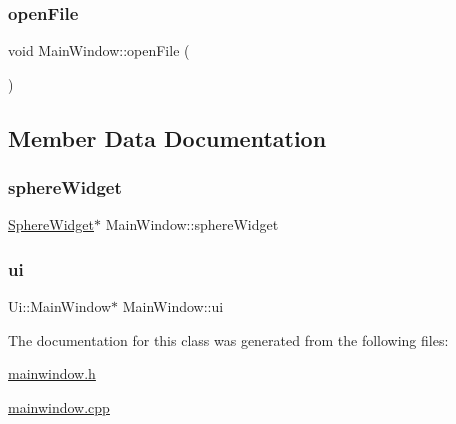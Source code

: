 \subsubsection{\texorpdfstring{open\+File}{openFile}}
{\footnotesize\ttfamily void Main\+Window\+::open\+File (\begin{DoxyParamCaption}{ }\end{DoxyParamCaption})\hspace{0.3cm}{\ttfamily [slot]}}



\subsection{Member Data Documentation}
\mbox{\label{class_main_window_afc60f18ae3cf60a9c231d8344a5bbda8}} 
\subsubsection{\texorpdfstring{sphere\+Widget}{sphereWidget}}
{\footnotesize\ttfamily \hyperlink{class_sphere_widget}{Sphere\+Widget}$\ast$ Main\+Window\+::sphere\+Widget\hspace{0.3cm}{\ttfamily [private]}}

\mbox{\label{class_main_window_a35466a70ed47252a0191168126a352a5}} 
\subsubsection{\texorpdfstring{ui}{ui}}
{\footnotesize\ttfamily Ui\+::\+Main\+Window$\ast$ Main\+Window\+::ui\hspace{0.3cm}{\ttfamily [private]}}



The documentation for this class was generated from the following files\+:\begin{DoxyCompactItemize}
\item 
\hyperlink{mainwindow_8h}{mainwindow.\+h}\item 
\hyperlink{mainwindow_8cpp}{mainwindow.\+cpp}\end{DoxyCompactItemize}
